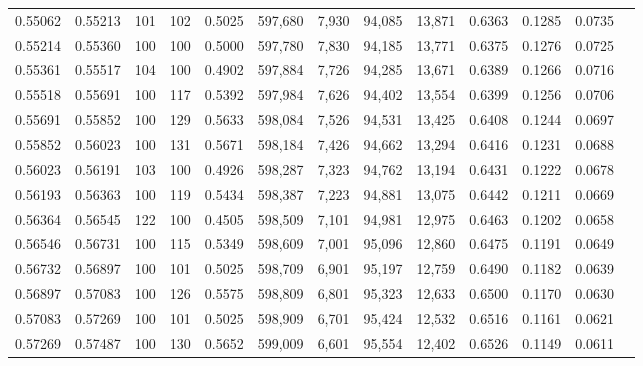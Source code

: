 \begin{tabular}{rrrrrrrrrrrrr}
0.55062 & 0.55213 &   101 & 102 &                                     0.5025 & 597,680 &   7,930 &  94,085 &  13,871 & 0.6363 & 0.1285 & 0.0735 \\
0.55214 & 0.55360 &   100 & 100 &                                     0.5000 & 597,780 &   7,830 &  94,185 &  13,771 & 0.6375 & 0.1276 & 0.0725 \\
0.55361 & 0.55517 &   104 & 100 &                                     0.4902 & 597,884 &   7,726 &  94,285 &  13,671 & 0.6389 & 0.1266 & 0.0716 \\
0.55518 & 0.55691 &   100 & 117 &                                     0.5392 & 597,984 &   7,626 &  94,402 &  13,554 & 0.6399 & 0.1256 & 0.0706 \\
0.55691 & 0.55852 &   100 & 129 &                                     0.5633 & 598,084 &   7,526 &  94,531 &  13,425 & 0.6408 & 0.1244 & 0.0697 \\
0.55852 & 0.56023 &   100 & 131 &                                     0.5671 & 598,184 &   7,426 &  94,662 &  13,294 & 0.6416 & 0.1231 & 0.0688 \\
0.56023 & 0.56191 &   103 & 100 &                                     0.4926 & 598,287 &   7,323 &  94,762 &  13,194 & 0.6431 & 0.1222 & 0.0678 \\
0.56193 & 0.56363 &   100 & 119 &                                     0.5434 & 598,387 &   7,223 &  94,881 &  13,075 & 0.6442 & 0.1211 & 0.0669 \\
0.56364 & 0.56545 &   122 & 100 &                                     0.4505 & 598,509 &   7,101 &  94,981 &  12,975 & 0.6463 & 0.1202 & 0.0658 \\
0.56546 & 0.56731 &   100 & 115 &                                     0.5349 & 598,609 &   7,001 &  95,096 &  12,860 & 0.6475 & 0.1191 & 0.0649 \\
0.56732 & 0.56897 &   100 & 101 &                                     0.5025 & 598,709 &   6,901 &  95,197 &  12,759 & 0.6490 & 0.1182 & 0.0639 \\
0.56897 & 0.57083 &   100 & 126 &                                     0.5575 & 598,809 &   6,801 &  95,323 &  12,633 & 0.6500 & 0.1170 & 0.0630 \\
0.57083 & 0.57269 &   100 & 101 &                                     0.5025 & 598,909 &   6,701 &  95,424 &  12,532 & 0.6516 & 0.1161 & 0.0621 \\
0.57269 & 0.57487 &   100 & 130 &                                     0.5652 & 599,009 &   6,601 &  95,554 &  12,402 & 0.6526 & 0.1149 & 0.0611 \\

\end{tabular}
